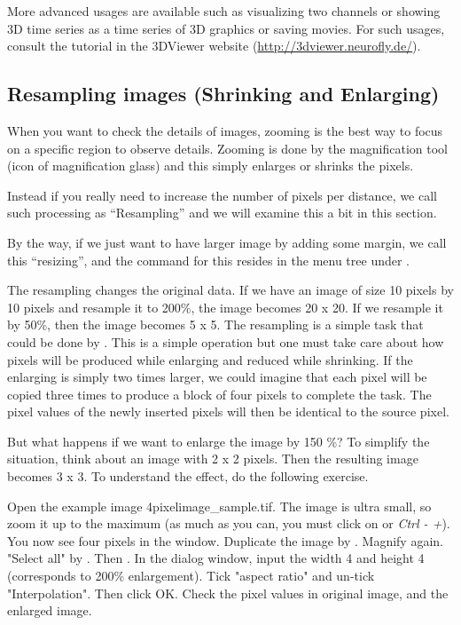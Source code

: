 More advanced usages are available such as visualizing two channels or showing 3D time series as a time series of 3D graphics or saving movies. For such usages, consult the tutorial in the 3DViewer website (\url{http://3dviewer.neurofly.de/}).  

\subsection{Resampling images (Shrinking and Enlarging)}

When you want to check the details of images, zooming is the best way to focus on a specific region to observe details.  Zooming is done by the magnification tool (icon of
magnification glass) and this simply enlarges or shrinks the pixels.

Instead if you really need to increase the number of pixels per distance, we call such processing as ``Resampling'' and we will examine this a bit in this section. 

By the way, if we just want to have larger image by adding some margin, we call this ``resizing'', and the command for this resides in the menu tree under .

The resampling changes the original data. If we
have an image of size 10 pixels by 10 pixels and resample it to 200\%, the image
becomes 20 x 20.
If we resample it by 50\%, then the image becomes 5 x 5. The resampling is a simple task
that could be done by . This is a simple
operation but one must take care about how pixels will be produced while
enlarging and reduced while shrinking. If the enlarging is simply two times
larger, we could imagine that each pixel will be copied three times to produce a
block of four pixels to complete the task. The pixel values of the newly
inserted pixels will then be identical to the source pixel.

But what happens if we want to enlarge the image by 150 \%? To simplify the
situation, think about an image with 2 x 2 pixels. Then the resulting image
becomes 3 x 3. To understand the effect, do the following exercise.


\begin{indentexercise}{1}
Open the example image
4pixelimage\_sample.tif. The image is ultra small, so zoom it
up to the maximum (as much as you can, you must click on or
\textit{Ctrl - +}). You now see four pixels in the window.
Duplicate the image by .
Magnify again. "Select all" by
.
Then .
In the dialog window, input the width 4 and height 4 (corresponds to
200\% enlargement). Tick "aspect
ratio" and
un-tick "Interpolation". Then click
OK. Check the pixel values in original image, and the enlarged image.
\end{indentexercise}


